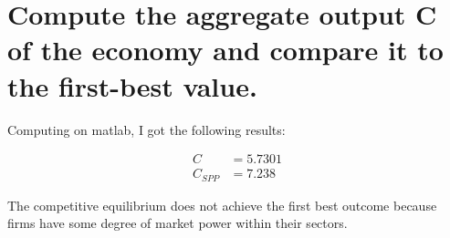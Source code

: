 \documentclass[12pt,oneside,reqno]{amsart}
\begin{document}
\section{Compute the aggregate output C of the economy and compare it to the first-best value.}
Computing on matlab, I got the following results:

\begin{align*}
C & = 5.7301 
\\
C_{SPP} & = 7.238
\end{align*}

The competitive equilibrium does not achieve the first best outcome because firms have some degree of market power within their sectors. 
\end{document}
